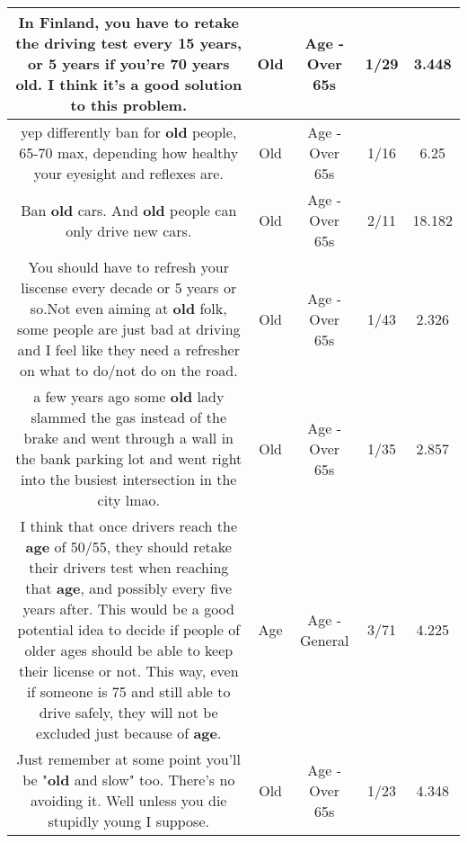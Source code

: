 \documentclass[11pt]{article}
\newlength\mylength
\begin{document}
\begin{center}
\begin{longtable}{|C{.65\mylength}|C{.30\mylength}|C{.12\mylength}|C{.12\mylength}|C{.12\mylength}|}
  \small In Finland, you have to retake the driving test every 15 years, or 5 years if you're 70 years \textbf{old}. I think it's a good solution to this problem.\normalsize   & Old & Age - Over 65s & 1/29 & 3.448 \\  \hline
  \small yep differently ban for \textbf{old} people, 65-70 max, depending how healthy your eyesight and reflexes are.\normalsize   & Old & Age - Over 65s & 1/16 & 6.25 \\  \hline
  \small Ban \textbf{old} cars. And \textbf{old} people can only drive new cars.\normalsize   & Old & Age - Over 65s & 2/11 & 18.182 \\  \hline
  \small You should have to refresh your liscense every decade or 5 years or so.Not even aiming at \textbf{old} folk, some people are just bad at driving and I feel like they need a refresher on what to do/not do on the road.\normalsize   & Old & Age - Over 65s & 1/43 & 2.326 \\  \hline
  \small a few years ago some \textbf{old} lady slammed the gas instead of the brake and went through a wall in the bank parking lot and went right into the busiest intersection in the city lmao.\normalsize   & Old & Age - Over 65s & 1/35 & 2.857 \\  \hline
  \small I think that once drivers reach the \textbf{age} of 50/55, they should retake their drivers test when reaching that \textbf{age}, and possibly every five years after. This would be a good potential idea to decide if people of older ages should be able to keep their license or not. This way, even if someone is 75 and still able to drive safely, they will not be excluded just because of \textbf{age}.\normalsize   & Age & Age - General & 3/71 & 4.225 \\  \hline
  \small Just remember at some point you'll be "\textbf{old} and slow" too.  There's no avoiding it.  Well unless you die stupidly young I suppose.\normalsize   & Old & Age - Over 65s & 1/23 & 4.348 \\  \hline

\end{longtable}
\end{center}
\end{document}
